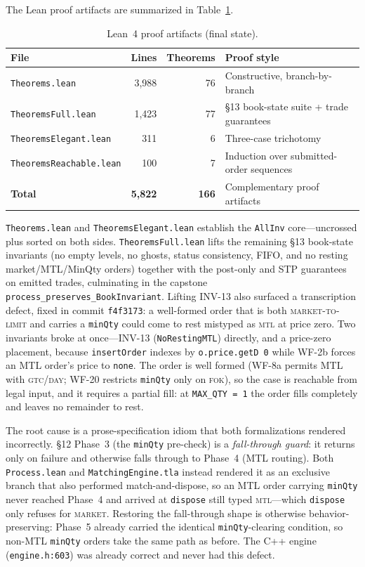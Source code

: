 \documentclass[11pt,a4paper]{article}
\begin{document}
The Lean proof artifacts are summarized in Table~\ref{tab:lean-stats}.

\begin{table}[H]
\centering
\caption{Lean~4 proof artifacts (final state).}
\label{tab:lean-stats}
\small
\begin{tabular}{@{}lrrl@{}}
\toprule
File & Lines & Theorems & Proof style \\
\midrule
\texttt{Theorems.lean}         & 3{,}988 & 76 & Constructive, branch-by-branch \\
\texttt{TheoremsFull.lean}     & 1{,}423 & 77 & \S13 book-state suite + trade guarantees \\
\texttt{TheoremsElegant.lean}  &    311  &  6 & Three-case trichotomy \\
\texttt{TheoremsReachable.lean}&    100  &  7 & Induction over submitted-order sequences \\
\midrule
\textbf{Total}                 & \textbf{5{,}822} & \textbf{166} & Complementary proof artifacts \\
\bottomrule
\end{tabular}
\end{table}

\texttt{Theorems.lean} and \texttt{TheoremsElegant.lean} establish the
\texttt{AllInv} core---uncrossed plus sorted on both sides.
\texttt{TheoremsFull.lean} lifts the remaining \S13 book-state
invariants (no empty levels, no ghosts, status consistency, FIFO, and
no resting market/MTL/MinQty orders) together with the post-only and
STP guarantees on emitted trades, culminating in the capstone
\texttt{process\_preserves\_BookInvariant}. Lifting INV-13 also
surfaced a transcription defect, fixed in commit \texttt{f4f3173}: a
well-formed order that is both \textsc{market-to-limit} and carries a
\texttt{minQty} could come to rest mistyped as \textsc{mtl} at price
zero. Two invariants broke at once---INV-13 (\texttt{NoRestingMTL})
directly, and a price-zero placement, because \texttt{insertOrder}
indexes by \texttt{o.price.getD 0} while WF-2b forces an MTL order's
price to \texttt{none}. The order is well formed (WF-8a permits MTL
with \textsc{gtc}/\textsc{day}; WF-20 restricts \texttt{minQty} only on
\textsc{fok}), so the case is reachable from legal input, and it
requires a partial fill: at \texttt{MAX\_QTY = 1} the order fills
completely and leaves no remainder to rest.

The root cause is a prose-specification idiom that both
formalizations rendered incorrectly. \S12 Phase~3 (the \texttt{minQty}
pre-check) is a \emph{fall-through guard}: it returns only on failure
and otherwise falls through to Phase~4 (MTL routing). Both
\texttt{Process.lean} and \texttt{MatchingEngine.tla} instead rendered
it as an exclusive branch that also performed match-and-dispose, so an
MTL order carrying \texttt{minQty} never reached Phase~4 and arrived
at \texttt{dispose} still typed \textsc{mtl}---which \texttt{dispose}
only refuses for \textsc{market}. Restoring the fall-through shape is
otherwise behavior-preserving: Phase~5 already carried the identical
\texttt{minQty}-clearing condition, so non-MTL \texttt{minQty} orders
take the same path as before. The C++ engine
(\texttt{engine.h:603}) was already correct and never had this defect.
\end{document}
